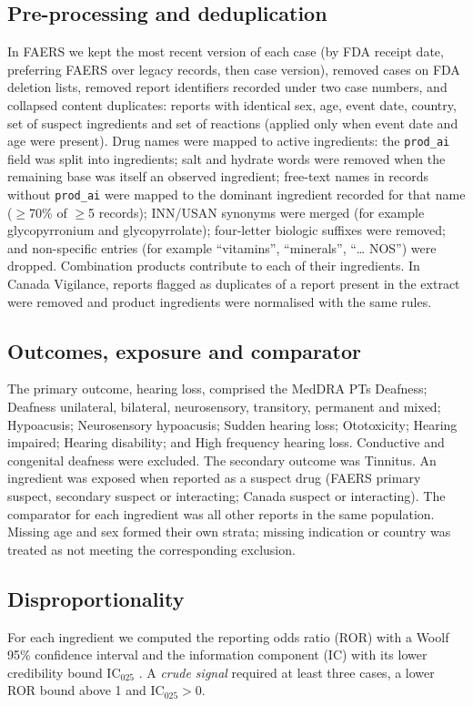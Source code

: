 \documentclass[11pt]{article}
\begin{document}
\subsection{Pre-processing and deduplication}
In FAERS we kept the most recent version of each case (by FDA receipt date, preferring FAERS over legacy records, then case
version), removed cases on FDA deletion lists, removed report identifiers recorded under two case numbers, and collapsed
content duplicates: reports with identical sex, age, event date, country, set of suspect ingredients and set of reactions
(applied only when event date and age were present). Drug names were mapped to active ingredients: the \texttt{prod\_ai}
field was split into ingredients; salt and hydrate words were removed when the remaining base was itself an observed
ingredient; free-text names in records without \texttt{prod\_ai} were mapped to the dominant ingredient recorded for that
name ($\geq$70\% of $\geq$5 records); INN/USAN synonyms were merged (for example glycopyrronium and glycopyrrolate);
four-letter biologic suffixes were removed; and non-specific entries (for example ``vitamins'', ``minerals'', ``\ldots{} NOS'')
were dropped. Combination products contribute to each of their ingredients. In Canada Vigilance, reports flagged as
duplicates of a report present in the extract were removed and product ingredients were normalised with the same rules.

\subsection{Outcomes, exposure and comparator}
The primary outcome, hearing loss, comprised the MedDRA PTs Deafness; Deafness unilateral, bilateral, neurosensory,
transitory, permanent and mixed; Hypoacusis; Neurosensory hypoacusis; Sudden hearing loss; Ototoxicity; Hearing impaired;
Hearing disability; and High frequency hearing loss. Conductive and congenital deafness were excluded. The secondary outcome
was Tinnitus. An ingredient was exposed when reported as a suspect drug (FAERS primary suspect, secondary suspect or
interacting; Canada suspect or interacting). The comparator for each ingredient was all other reports in the same
population. Missing age and sex formed their own strata; missing indication or country was treated as not meeting the
corresponding exclusion.

\subsection{Disproportionality}
For each ingredient we computed the reporting odds ratio (ROR) with a Woolf 95\% confidence interval \cite{woolf1955,rothman2004}
and the information component (IC) with its lower credibility bound IC$_{025}$ \cite{noren2006}. A \emph{crude signal}
required at least three cases, a lower ROR bound above 1 and IC$_{025}>0$.
\end{document}
